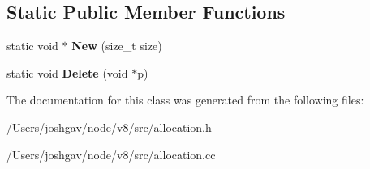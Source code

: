 \subsection*{Static Public Member Functions}
\begin{DoxyCompactItemize}
\item 
static void $\ast$ {\bfseries New} (size\+\_\+t size)\hypertarget{classv8_1_1internal_1_1_malloced_a20e13f78edcc04c7bb514c0659dc49fa}{}\label{classv8_1_1internal_1_1_malloced_a20e13f78edcc04c7bb514c0659dc49fa}

\item 
static void {\bfseries Delete} (void $\ast$p)\hypertarget{classv8_1_1internal_1_1_malloced_ace0f2f3fe0407b68f037360431dfc30a}{}\label{classv8_1_1internal_1_1_malloced_ace0f2f3fe0407b68f037360431dfc30a}

\end{DoxyCompactItemize}


The documentation for this class was generated from the following files\+:\begin{DoxyCompactItemize}
\item 
/\+Users/joshgav/node/v8/src/allocation.\+h\item 
/\+Users/joshgav/node/v8/src/allocation.\+cc\end{DoxyCompactItemize}
